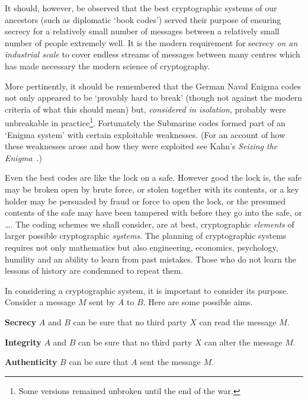 \documentclass[12pt,a4paper]{article}
\theoremstyle{plain}
\theoremstyle{definition}
\begin{document}
    It should, however, be observed that the
    best cryptographic systems of our ancestors
    (such as diplomatic `book codes') served their
    purpose of ensuring secrecy for a relatively
    small number of messages between a relatively
    small number of people extremely well. It
    is the modern requirement for secrecy
    \emph{on an industrial scale} to cover
    endless streams of messages between
    many centres which has made necessary
    the modern science of cryptography.

    More pertinently, it should be remembered
    that the German Naval Enigma codes
    not only appeared to be `provably hard to break'
    (though not against the modern criteria
    of what this should mean) but, \emph{considered
    in isolation}, probably were unbreakable
    in practice\footnote{Some versions remained
    unbroken until the end of the war.}.
    Fortunately the Submarine codes formed part
    of an `Enigma system' with certain
    exploitable weaknesses. (For an account
    of how these weaknesses arose and how they
    were exploited see Kahn's \emph{Seizing
    the Enigma}~\cite{Kahn Enigma}.)

    Even the best codes are like the
    lock on a safe. However good the lock is,
    the safe may be broken open by brute force,
    or stolen together with its contents,
    or a key holder may be
    persuaded by fraud or force to open
    the lock, or the presumed
    contents of the safe
    may have been tampered with before they
    go into the safe, or \dots.
    The coding schemes we shall consider,
    are at best, cryptographic \emph{elements}
    of larger possible cryptographic \emph{systems}.
    The planning of cryptographic systems
    requires not only mathematics but also
    engineering, economics, psychology,
    humility
    and an ability to learn from past mistakes.
    Those who do not learn the lessons of history are
    condemned to repeat them.

    In considering a cryptographic system, it
    is important to consider its purpose.
    Consider a message $M$ sent by $A$ to $B$.
    Here are some possible aims.

    \noindent
    {\bf Secrecy} $A$ and $B$ can be sure that no
    third party $X$ can read the message $M$.

    \noindent
    {\bf Integrity} $A$ and $B$ can be sure that no
    third party $X$ can alter the message $M$.

    \noindent
    {\bf Authenticity} $B$ can be sure that $A$
    sent the message $M$.
\end{document}
